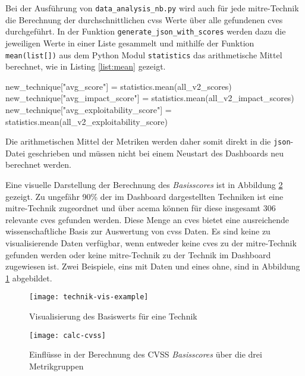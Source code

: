 Bei der Ausführung von \verb|data_analysis_nb.py| wird auch für jede \gls{mitre}-Technik die Berechnung der durchschnittlichen \gls{cvss} Werte über alle gefundenen \glspl{cve} durchgeführt. In der Funktion \verb|generate_json_with_scores| werden dazu die jeweiligen Werte in einer Liste gesammelt und mithilfe der Funktion \verb|mean(list[])| aus dem Python Modul \verb|statistics| das arithmetische Mittel berechnet, wie in Listing \ref{list:mean} gezeigt.
\begin{code}[caption=Berechnung des arithmetischen Mittels aus den CVSS Metriken mehrerer CVEs]
    new_technique["avg_score"] = statistics.mean(all_v2_scores)
    new_technique["avg_impact_score"] = statistics.mean(all_v2_impact_scores)
    new_technique["avg_exploitability_score"] = statistics.mean(all_v2_exploitability_score)
\end{code}
\label{list:mean}
Die arithmetischen Mittel der Metriken werden daher somit direkt in die \verb|json|-Datei geschrieben und müssen nicht bei einem Neustart des Dashboards neu berechnet werden.

Eine visuelle Darstellung der Berechnung des \textit{Basisscores} ist in Abbildung \ref{fig:calc-cvss} gezeigt. Zu ungefähr 90\% der im Dashboard dargestellten Techniken ist eine \gls{mitre}-Technik zugeordnet und über \gls{acema} können für diese insgesamt 306 relevante \glspl{cve} gefunden werden. Diese Menge an \glspl{cve} bietet eine ausreichende wissenschaftliche Basis zur Auswertung von \gls{cvss} Daten. Es sind keine zu visualisierende Daten verfügbar, wenn entweder keine \glspl{cve} zu der \gls{mitre}-Technik gefunden werden oder keine \gls{mitre}-Technik zu der Technik im Dashboard zugewiesen ist. Zwei Beispiele, eins mit Daten und eines ohne, sind in Abbildung \ref{fig:technik-vis-example} abgebildet.

\begin{figure}
    \centering
    \texttt{[image: technik-vis-example]}
    \caption{Visualisierung des Basiswerts für eine Technik}
    \label{fig:technik-vis-example}
\end{figure}


\begin{figure}
    \centering
    \texttt{[image: calc-cvss]}
    \caption{Einflüsse in der Berechnung des CVSS \textit{Basisscores} über die drei Metrikgruppen}
    \label{fig:calc-cvss}
\end{figure}

